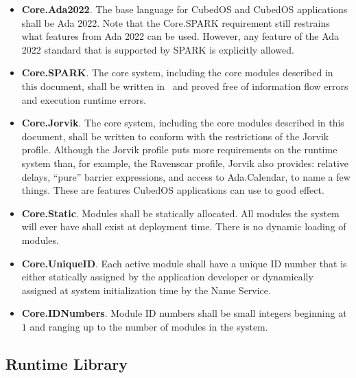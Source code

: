 \begin{itemize}
\item \textbf{Core.Ada2022}. The base language for CubedOS and CubedOS applications shall be Ada
2022. Note that the Core.SPARK requirement still restrains what features from Ada 2022 can be
used. However, any feature of the Ada 2022 standard that is supported by SPARK is explicitly
allowed.

\item \textbf{Core.SPARK}. The core system, including the core modules described in this
document, shall be written in \SPARK\ and proved free of information flow errors and execution
runtime errors.

\item \textbf{Core.Jorvik}. The core system, including the core modules described in this
document, shall be written to conform with the restrictions of the Jorvik profile. Although the
Jorvik profile puts more requirements on the runtime system than, for example, the Ravenscar
profile, Jorvik also provides: relative delays, ``pure'' barrier expressions, and access to
Ada.Calendar, to name a few things. These are features CubedOS applications can use to good
effect.

\item \textbf{Core.Static}. Modules shall be statically allocated. All modules the system will
ever have shall exist at deployment time. There is no dynamic loading of modules. 

\item \textbf{Core.UniqueID}. Each active module shall have a unique ID number that is either
statically assigned by the application developer or dynamically assigned at system
initialization time by the Name Service. 

\item \textbf{Core.IDNumbers}. Module ID numbers shall be small integers beginning at $1$ and
ranging up to the number of modules in the system.
\end{itemize}

\subsection{Runtime Library}
\label{sec:requirements-runtime-library}

